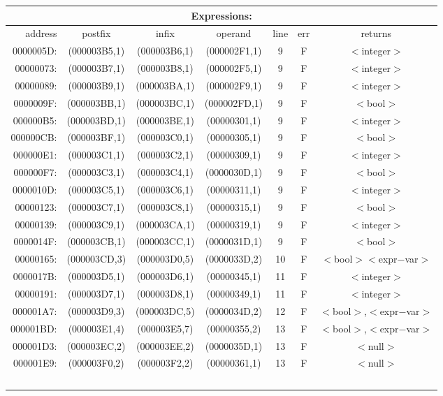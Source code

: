 \begin{center}\begin{tabular}{|r|c|c|c|c|c|c|}
\hline
\multicolumn{7}{|c|}{Expressions:} \\
\hline
address & postfix & infix & operand & line & err & returns \\
\hline\hline
0000005D: & (000003B5,1) & (000003B6,1) & (000002F1,1) & 9 & F & $<$integer$>$ \\
00000073: & (000003B7,1) & (000003B8,1) & (000002F5,1) & 9 & F & $<$integer$>$ \\
00000089: & (000003B9,1) & (000003BA,1) & (000002F9,1) & 9 & F & $<$integer$>$ \\
0000009F: & (000003BB,1) & (000003BC,1) & (000002FD,1) & 9 & F & $<$bool$>$ \\
000000B5: & (000003BD,1) & (000003BE,1) & (00000301,1) & 9 & F & $<$integer$>$ \\
000000CB: & (000003BF,1) & (000003C0,1) & (00000305,1) & 9 & F & $<$bool$>$ \\
000000E1: & (000003C1,1) & (000003C2,1) & (00000309,1) & 9 & F & $<$integer$>$ \\
000000F7: & (000003C3,1) & (000003C4,1) & (0000030D,1) & 9 & F & $<$bool$>$ \\
0000010D: & (000003C5,1) & (000003C6,1) & (00000311,1) & 9 & F & $<$integer$>$ \\
00000123: & (000003C7,1) & (000003C8,1) & (00000315,1) & 9 & F & $<$bool$>$ \\
00000139: & (000003C9,1) & (000003CA,1) & (00000319,1) & 9 & F & $<$integer$>$ \\
0000014F: & (000003CB,1) & (000003CC,1) & (0000031D,1) & 9 & F & $<$bool$>$ \\
00000165: & (000003CD,3) & (000003D0,5) & (0000033D,2) & 10 & F & $<$bool$>$$<$expr$-$var$>$ \\
0000017B: & (000003D5,1) & (000003D6,1) & (00000345,1) & 11 & F & $<$integer$>$ \\
00000191: & (000003D7,1) & (000003D8,1) & (00000349,1) & 11 & F & $<$integer$>$ \\
000001A7: & (000003D9,3) & (000003DC,5) & (0000034D,2) & 12 & F & $<$bool$>$,$<$expr$-$var$>$ \\
000001BD: & (000003E1,4) & (000003E5,7) & (00000355,2) & 13 & F & $<$bool$>$,$<$expr$-$var$>$ \\
000001D3: & (000003EC,2) & (000003EE,2) & (0000035D,1) & 13 & F & $<$null$>$ \\
000001E9: & (000003F0,2) & (000003F2,2) & (00000361,1) & 13 & F & $<$null$>$ \\
$$
\end{tabular}
\end{center}
